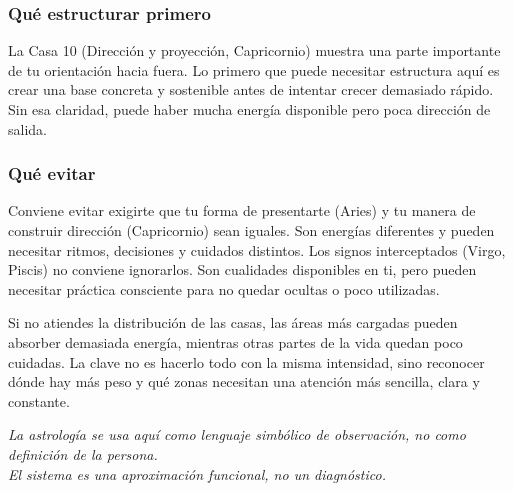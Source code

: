 \documentclass[11pt,a4paper]{article}
\begin{document}
\subsubsection*{Qué estructurar primero}
La Casa 10 (Dirección y proyección, Capricornio) muestra una parte importante de tu orientación hacia fuera. Lo primero que puede necesitar estructura aquí es crear una base concreta y sostenible antes de intentar crecer demasiado rápido. Sin esa claridad, puede haber mucha energía disponible pero poca dirección de salida.

\subsubsection*{Qué evitar}
Conviene evitar exigirte que tu forma de presentarte (Aries) y tu manera de construir dirección (Capricornio) sean iguales. Son energías diferentes y pueden necesitar ritmos, decisiones y cuidados distintos. Los signos interceptados (Virgo, Piscis) no conviene ignorarlos. Son cualidades disponibles en ti, pero pueden necesitar práctica consciente para no quedar ocultas o poco utilizadas.

\vspace{0.6cm}
Si no atiendes la distribución de las casas, las áreas más cargadas pueden absorber demasiada energía, mientras otras partes de la vida quedan poco cuidadas. La clave no es hacerlo todo con la misma intensidad, sino reconocer dónde hay más peso y qué zonas necesitan una atención más sencilla, clara y constante.

\vspace{0.5cm}
\begin{center}
{\small\itshape\color{grisai}
La astrología se usa aquí como lenguaje simbólico de observación, no como definición de la persona.\\
El sistema es una aproximación funcional, no un diagnóstico.
}
\end{center}
\end{document}
